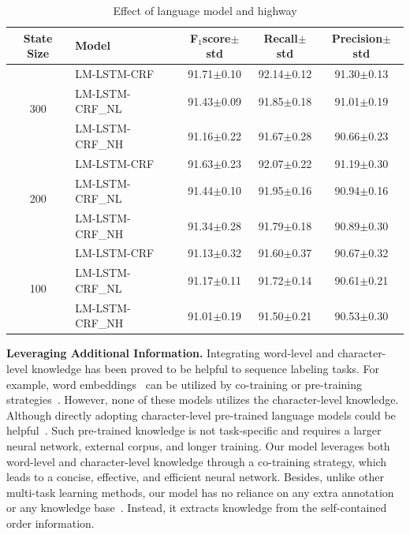 \documentclass[letterpaper]{article} %
\newcommand{\our}{\textsc{LM-LSTM-CRF}\xspace}
\newcommand{\ournl}{\textsc{LM-LSTM-CRF\_NL}\xspace}
\newcommand{\ournh}{\textsc{LM-LSTM-CRF\_NH}\xspace}
\newcommand{\sbef}{}
\begin{document}
\begin{table}
\center
\scalebox{0.65}
{
\begin{tabular}{c|l|c|c|c}
\hline
State Size & Model & F$_1$score$\pm$std &  Recall$\pm$std &Precision$\pm$std \\
\hline
\hline
\multirow{3}{*}{300} & \our & 91.71$\pm$0.10 &92.14$\pm$0.12 & 91.30$\pm$0.13 \\
\cline{2-5}
& \ournl & 91.43$\pm$0.09 & 91.85$\pm$0.18 & 91.01$\pm$0.19 \\
\cline{2-5}
& \ournh & 91.16$\pm$0.22 & 91.67$\pm$0.28 & 90.66$\pm$0.23 \\
\hline
\hline

\multirow{3}{*}{200} & \our & 91.63$\pm$0.23 &92.07$\pm$0.22 & 91.19$\pm$0.30 \\
\cline{2-5}
& \ournl & 91.44$\pm$0.10 & 91.95$\pm$0.16 & 90.94$\pm$0.16 \\
\cline{2-5}
& \ournh & 91.34$\pm$0.28 & 91.79$\pm$0.18 & 90.89$\pm$0.30 \\
\hline
\hline
\multirow{3}{*}{100} & \our & 91.13$\pm$0.32 &91.60$\pm$0.37 & 90.67$\pm$0.32 \\
\cline{2-5}
& \ournl & 91.17$\pm$0.11 & 91.72$\pm$0.14 & 90.61$\pm$0.21 \\
\cline{2-5}
& \ournh & 91.01$\pm$0.19 & 91.50$\pm$0.21 & 90.53$\pm$0.30 \\
\hline

\end{tabular}
}
\caption{Effect of language model and highway}\label{tbl:hw}
\end{table}

\noindent\textbf{Leveraging Additional Information.}
Integrating word-level and character-level knowledge has been proved to be helpful to sequence labeling tasks.
For example, word embeddings~\cite{mikolov2013distributed,pennington2014glove} can be utilized by co-training or pre-training strategies~\cite{2017arXiv170700166L,2016naacl}.
However, none of these models utilizes the character-level knowledge.
Although directly adopting character-level pre-trained language models could be helpful~\cite{peters2017semi}.
Such pre-trained knowledge is not task-specific and requires a larger neural network, external corpus, and longer training. 
Our model leverages both word-level and character-level knowledge through a co-training strategy, which leads to a concise, effective, and efficient neural network.
Besides, unlike other multi-task learning methods, our model has no reliance on any extra annotation~\cite{peters2017semi} or any knowledge base~\cite{shang2017automated}. 
Instead, it extracts knowledge from the self-contained order information.
\end{document}
